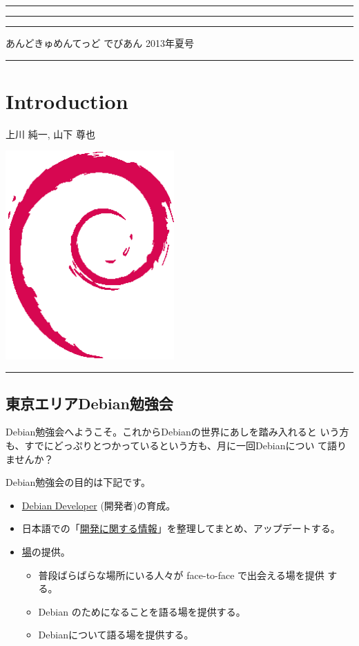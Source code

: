 \documentclass[mingoth,a4paper]{jsarticle}
\renewcommand{\dancersection}[2]{%
\newpage
あんどきゅめんてっど でびあん 2013年夏号
%
\vspace{0.1mm}\\
{\color{dancerdarkblue}\rule{\hsize}{2mm}}

%
%
\begin{minipage}[t]{0.6\hsize}
\color{dancerdarkblue}
\vspace{1cm}
\section{#1}
\hfill{}#2\\
\end{minipage}
\begin{minipage}[t]{0.4\hsize}
\vspace{-2cm}
\hfill{}\includegraphics[height=8cm]{image200502/openlogo-nd.eps}\\
\vspace{-5cm}
\end{minipage}
%
{\color{dancerlightblue}\rule{0.66\hsize}{2mm}}
%
\vspace{2cm}
}
\begin{document}
\setcounter{page}{1}
\begin{minipage}[]{0.2\hsize}
 \colorbox{dancerlightblue}{}
\end{minipage}
\begin{minipage}[]{0.8\hsize}
\hrule
\vspace{1mm}
\hrule
\setcounter{tocdepth}{1}
{\small
\begin{multicols}{2}
  \tableofcontents
\end{multicols}
} %
\vspace{1mm}
\hrule
\vspace{3cm}

\end{minipage}

\dancersection{Introduction}{上川 純一, 山下 尊也}

\subsection{東京エリアDebian勉強会}

 Debian勉強会へようこそ。これからDebianの世界にあしを踏み入れると
 いう方も、すでにどっぷりとつかっているという方も、月に一回Debianについ
 て語りませんか？

 Debian勉強会の目的は下記です。

\begin{itemize}
 \item \underline{Debian Developer} (開発者)の育成。
 \item 日本語での「\underline{開発に関する情報}」を整理してまとめ、アップデートする。
 \item \underline{場}の提供。
 \begin{itemize}
  \item 普段ばらばらな場所にいる人々が face-to-face で出会える場を提供
	する。
  \item Debian のためになることを語る場を提供する。
  \item Debianについて語る場を提供する。
 \end{itemize}
\end{itemize}
\end{document}
